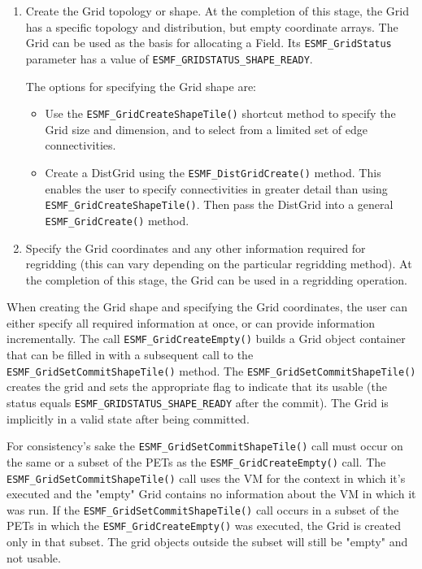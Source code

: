 \begin{enumerate}

\item 
\begin{sloppypar}
Create the Grid topology or shape.  At the completion of this
stage, the Grid has a specific topology and distribution, but
empty coordinate arrays.  The Grid can be used as the basis for
allocating a Field. Its {\tt ESMF\_GridStatus} parameter has 
a value of {\tt ESMF\_GRIDSTATUS\_SHAPE\_READY}.  
\end{sloppypar}

The options for specifying the Grid shape are:
\begin{itemize}
\item Use the {\tt ESMF\_GridCreateShapeTile()} shortcut method to 
specify the Grid size and dimension, and to select from a limited set
of edge connectivities.   
\item Create a DistGrid using the {\tt ESMF\_DistGridCreate()}
method.  This enables the user to specify connectivities in 
greater detail than using {\tt ESMF\_GridCreateShapeTile()}.  Then
pass the DistGrid into a general {\tt ESMF\_GridCreate()} method.
\end{itemize}

\item Specify the Grid coordinates and any other information
required for regridding (this can vary depending on the particular
regridding method).  At the completion of this stage, the Grid can
be used in a regridding operation.
\end{enumerate}

When creating the Grid shape and specifying the Grid coordinates,
the user can either specify all required information at once,
or can provide information incrementally.  The call
{\tt ESMF\_GridCreateEmpty()} builds a Grid object
container that can be filled in with a subsequent call to 
the {\tt ESMF\_GridSetCommitShapeTile()} method. 
The {\tt ESMF\_GridSetCommitShapeTile()} creates the 
grid and sets the appropriate flag to indicate that
its usable (the status equals {\tt ESMF\_GRIDSTATUS\_SHAPE\_READY}
after the commit). The Grid is implicitly in a valid state after being committed. 

\begin{sloppypar}
For consistency's sake the {\tt ESMF\_GridSetCommitShapeTile()}
call must occur on the same or a subset of the PETs as the
{\tt ESMF\_GridCreateEmpty()} call. The 
{\tt ESMF\_GridSetCommitShapeTile()} call uses the VM for
the context in which it's executed and the "empty" Grid contains
no information about the VM in which it was run.  If the
{\tt ESMF\_GridSetCommitShapeTile()} call occurs
in a subset of the PETs in which the {\tt ESMF\_GridCreateEmpty()} was 
executed, the Grid is created only in that subset. The grid objects outside the subset will
still be "empty" and not usable. 
\end{sloppypar}

